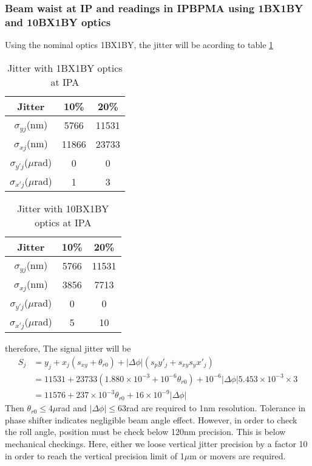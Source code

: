 \subsubsection{Beam waist at IP and readings in IPBPMA using 1BX1BY and 10BX1BY optics}
Using the nominal optics 1BX1BY, the jitter will be acording to table \ref{t-jitter1BX1BY-IPA}
\begin{table}[hbt]
\begin{center}
 \begin{tabular}{|c|c|c|}\hline
 Jitter &10\% & 20\%\\\hline
 $\sigma_{yj}$(nm) & 5766  &11531\\\hline
 $\sigma_{xj}$(nm) &11866&23733 \\\hline
 $\sigma_{y'j}$($\mu$rad) &0&0\\\hline
 $\sigma_{x'j}$($\mu$rad) &1&3\\\hline
 \end{tabular}
 \caption{Jitter with 1BX1BY optics at IPA}\label{t-jitter1BX1BY-IPA}
 \end{center}
\end{table}
\begin{table}[hbt]
\begin{center}
 \begin{tabular}{|c|c|c|}\hline
 Jitter &10\% & 20\%\\\hline
 $\sigma_{yj}$(nm) &5766&11531\\\hline
 $\sigma_{xj}$(nm) &3856&7713\\\hline
 $\sigma_{y'j}$($\mu$rad) &0&0\\\hline
 $\sigma_{x'j}$($\mu$rad) &5&10\\\hline
 \end{tabular}
 \caption{Jitter with 10BX1BY optics at IPA}\label{t-jitter10BX1BY-IPA}
 \end{center}
\end{table}
therefore, The signal jitter will be
\begin{align*}
S_j&=y_j+x_j(s_{xy}+\theta_{r0})+|\Delta\phi|(s_py'_j+s_{xy}s_yx'_j)\\
 &=11531+23733(1.880\times10^{-3}+10^{-6}\theta_{r0})+10^{-6}|\Delta\phi|5.453\times10^{-3}\times3\\
 &=11576+237\times10^{-3}\theta_{r0}+16\times10^{-9}|\Delta\phi|
\end{align*}
Then $\theta_{r0}\leq 4\mu$rad and $|\Delta\phi|\leq 63$rad are required to 1nm resolution. Tolerance in phase shifter indicates negligible beam angle effect. However, in order to check the roll angle, position must be check below 120nm precision. This is below mechanical checkings. Here, either we loose vertical jitter precision by a factor 10 in order to reach the vertical precision limit of 1$\mu$m or movers are required.\par
